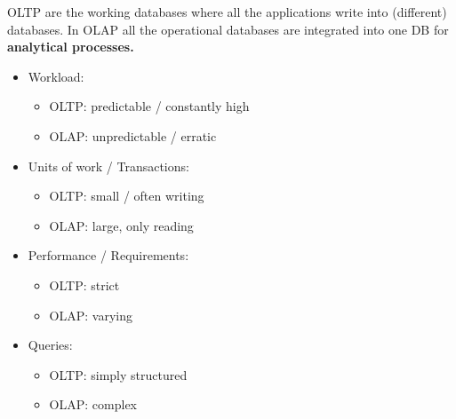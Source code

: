 \begin{breakbox}
OLTP are the working databases where all the applications write into
(different) databases. In OLAP all the operational databases are integrated
into one DB for \textbf{analytical processes.}
\begin{itemize}
	\item Workload:
	\begin{itemize}
		\item OLTP: predictable / constantly high
		\item OLAP: unpredictable / erratic
	\end{itemize}
	\item Units of work / Transactions:
	\begin{itemize}
		\item OLTP: small / often writing
		\item OLAP: large, only reading
	\end{itemize}
	\item Performance / Requirements:
	\begin{itemize}
		\item OLTP: strict
		\item OLAP: varying
	\end{itemize}
	\item Queries:
	\begin{itemize}
		\item OLTP: simply structured
		\item OLAP: complex
	\end{itemize}
\end{itemize}
\end{breakbox}
